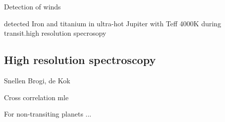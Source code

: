 Detection of winds



\citep{hoeijmakers_atomic_2018} detected Iron and titanium in ultra-hot Jupiter with Teff 4000K during transit.high resolution specrosopy






\subsection{High resolution spectroscopy}
Snellen  Brogi, de Kok

Cross correlation mle  \citet{piskorz_evidence_2016}


For non-transiting planets ...

